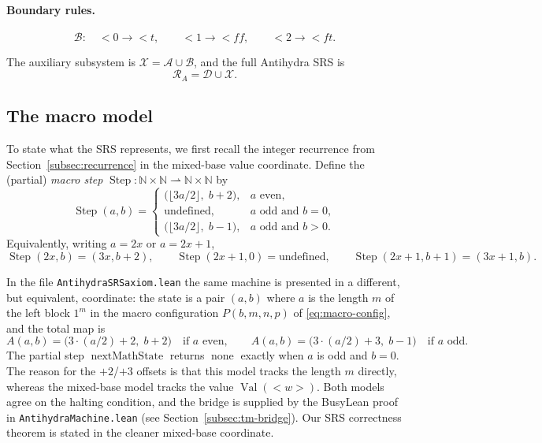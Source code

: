 \documentclass[11pt,a4paper]{article}
\theoremstyle{definition}
\newcommand{\lt}{<}
\newcommand{\gt}{>}
\newcommand{\Nat}{\mathbb{N}}
\newcommand{\val}{\operatorname{Val}}
\newcommand{\ones}[1]{1^{#1}}
\newcommand{\auxA}{\mathcal{A}}
\newcommand{\auxB}{\mathcal{B}}
\newcommand{\auxRules}{\mathcal{X}}
\newcommand{\dynRules}{\mathcal{D}}
\newcommand{\antihydraSRS}{\mathcal{R}_{A}}
\newcommand{\macroStep}{\operatorname{Step}}
\newcommand{\nextMathState}{\operatorname{nextMathState}}
\newcommand{\none}{\operatorname{none}}
\begin{document}
\paragraph{Boundary rules.}
\begin{equation}
  \label{eq:lean-boundary}
  \auxB:\quad
  \lt 0\to\lt t,
  \qquad
  \lt 1\to\lt ff,
  \qquad
  \lt 2\to\lt ft.
\end{equation}

The auxiliary subsystem is $\auxRules=\auxA\cup\auxB$, and the full
Antihydra SRS is
\[
  \antihydraSRS=\dynRules\cup\auxRules.
\]

\subsection{The macro model}
\label{subsec:lean-macro}

To state what the SRS represents, we first recall the integer recurrence
from Section~\ref{subsec:recurrence} in the mixed-base value coordinate.
Define the (partial) \emph{macro step}
$\macroStep:\Nat\times\Nat\rightharpoonup\Nat\times\Nat$ by
\begin{equation}
  \label{eq:lean-macro-step}
  \macroStep(a,b)=
  \begin{cases}
    \bigl(\lfloor 3a/2\rfloor,\;b+2\bigr), & a\text{ even},\\
    \text{undefined}, & a\text{ odd and }b=0,\\
    \bigl(\lfloor 3a/2\rfloor,\;b-1\bigr), & a\text{ odd and }b>0.
  \end{cases}
\end{equation}
Equivalently, writing $a=2x$ or $a=2x+1$,
\begin{equation}
  \label{eq:lean-macro-explicit}
  \macroStep(2x,b)=(3x,b+2),
  \qquad
  \macroStep(2x+1,0)=\text{undefined},
  \qquad
  \macroStep(2x+1,b+1)=(3x+1,b).
\end{equation}

In the file \texttt{AntihydraSRSaxiom.lean} the same machine is
presented in a different, but equivalent, coordinate: the state is a
pair $(a,b)$ where $a$ is the length $m$ of the left block $\ones{m}$ in
the macro configuration $P(b,m,n,p)$ of \eqref{eq:macro-config}, and the
total map is
\[
  A(a,b)=\bigl(3\cdot(a/2)+2,\;b+2\bigr)\quad\text{if $a$ even},
  \qquad
  A(a,b)=\bigl(3\cdot(a/2)+3,\;b-1\bigr)\quad\text{if $a$ odd}.
\]
The partial step $\nextMathState$ returns $\none$ exactly when $a$ is
odd and $b=0$.  The reason for the $+2$/$+3$ offsets is that this model
tracks the length $m$ directly, whereas the mixed-base model tracks the
value $\val(\lt w\gt)$.  Both models agree on the halting condition, and
the bridge is supplied by the BusyLean proof in
\texttt{AntihydraMachine.lean} (see
Section~\ref{subsec:tm-bridge}).  Our SRS correctness theorem is stated
in the cleaner mixed-base coordinate.
\end{document}
